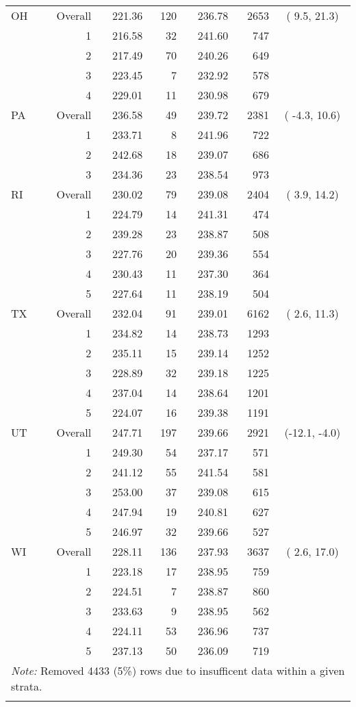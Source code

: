 \begin{longtable}{lrrr@{\extracolsep{.25cm}}rrc}
   \hline
OH & Overall & 221.36 & 120 & 236.78 & 2653 & (  9.5, 21.3) \\ 
   & 1 & 216.58 &  32 & 241.60 & 747 &  \\ 
   & 2 & 217.49 &  70 & 240.26 & 649 &  \\ 
   & 3 & 223.45 &   7 & 232.92 & 578 &  \\ 
   & 4 & 229.01 &  11 & 230.98 & 679 &  \\ 
   \hline
PA & Overall & 236.58 &  49 & 239.72 & 2381 & ( -4.3, 10.6) \\ 
   & 1 & 233.71 &   8 & 241.96 & 722 &  \\ 
   & 2 & 242.68 &  18 & 239.07 & 686 &  \\ 
   & 3 & 234.36 &  23 & 238.54 & 973 &  \\ 
   \hline
RI & Overall & 230.02 &  79 & 239.08 & 2404 & (  3.9, 14.2) \\ 
   & 1 & 224.79 &  14 & 241.31 & 474 &  \\ 
   & 2 & 239.28 &  23 & 238.87 & 508 &  \\ 
   & 3 & 227.76 &  20 & 239.36 & 554 &  \\ 
   & 4 & 230.43 &  11 & 237.30 & 364 &  \\ 
   & 5 & 227.64 &  11 & 238.19 & 504 &  \\ 
   \hline
TX & Overall & 232.04 &  91 & 239.01 & 6162 & (  2.6, 11.3) \\ 
   & 1 & 234.82 &  14 & 238.73 & 1293 &  \\ 
   & 2 & 235.11 &  15 & 239.14 & 1252 &  \\ 
   & 3 & 228.89 &  32 & 239.18 & 1225 &  \\ 
   & 4 & 237.04 &  14 & 238.64 & 1201 &  \\ 
   & 5 & 224.07 &  16 & 239.38 & 1191 &  \\ 
   \hline
UT & Overall & 247.71 & 197 & 239.66 & 2921 & (-12.1, -4.0) \\ 
   & 1 & 249.30 &  54 & 237.17 & 571 &  \\ 
   & 2 & 241.12 &  55 & 241.54 & 581 &  \\ 
   & 3 & 253.00 &  37 & 239.08 & 615 &  \\ 
   & 4 & 247.94 &  19 & 240.81 & 627 &  \\ 
   & 5 & 246.97 &  32 & 239.66 & 527 &  \\ 
   \hline
WI & Overall & 228.11 & 136 & 237.93 & 3637 & (  2.6, 17.0) \\ 
   & 1 & 223.18 &  17 & 238.95 & 759 &  \\ 
   & 2 & 224.51 &   7 & 238.87 & 860 &  \\ 
   & 3 & 233.63 &   9 & 238.95 & 562 &  \\ 
   & 4 & 224.11 &  53 & 236.96 & 737 &  \\ 
   & 5 & 237.13 &  50 & 236.09 & 719 &  \\ 
   \hline \multicolumn{7}{l}{\textit{Note:} Removed 4433 (5\%) rows due to insufficent data within a given strata.} \\\hline
\label{g4math-mlpsa-lrAIC}
\end{longtable}
